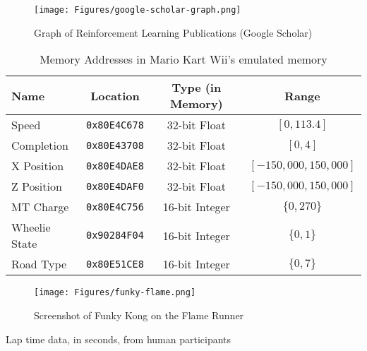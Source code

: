 \begin{figure}[hbt]
    \centering
    \texttt{[image: Figures/google-scholar-graph.png]}
    \caption{Graph of Reinforcement Learning Publications (Google Scholar)}
    \label{fig:rl-papers-graph}
\end{figure}
\begin{table}[hbt]
    \centering
    \begin{tabular}{l|c|c|c}
    \textbf{Name}  & \textbf{Location} & \textbf{Type (in Memory)} & \textbf{Range}\\
    \hline
     Speed  &        \texttt{0x80E4C678} & 32-bit Float  & $$[0, 113.4]$$\\
     Completion  &   \texttt{0x80E43708} & 32-bit Float  & $$[0, 4] $$\\
     X Position  &   \texttt{0x80E4DAE8} & 32-bit Float  & $$[-150,000, 150,000] $$\\
     Z Position  &   \texttt{0x80E4DAF0} & 32-bit Float  & $$[-150,000, 150,000] $$\\
     MT Charge &     \texttt{0x80E4C756} & 16-bit Integer& $$\{0,270\}$$\\
     Wheelie State & \texttt{0x90284F04} & 16-bit Integer& $$\{0,1\}$$\\
     Road Type &     \texttt{0x80E51CE8} & 16-bit Integer& $$ \{0,7\} $$\\
    \end{tabular}
    \caption{Memory Addresses in Mario Kart Wii's emulated memory}
    \label{tab:memory-addresses}
\end{table}
\begin{figure}[hb]
    \centering
    \texttt{[image: Figures/funky-flame.png]}
    \caption{Screenshot of Funky Kong on the Flame Runner}
    \label{fig:funky-flame}
\end{figure}
\begin{table}[hbt]
    \centering
    \caption{Lap time data, in seconds, from human participants}
    \label{tab:csv_table}
\end{table}